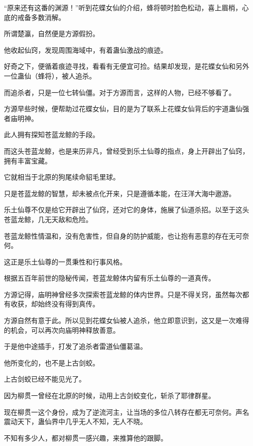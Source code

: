 
\begin{this_body}



“原来还有这番的渊源！”听到花蝶女仙的介绍，蜂将顿时脸色松动，喜上眉梢，心底的戒备多数消解。

所谓楚瀛，自然便是方源假扮。

他收起仙窍，发现周围海域中，有着蛊仙激战的痕迹。

好奇之下，便循着痕迹寻找，看看有无便宜可捡。结果却发现，是花蝶女仙和另外一位蛊仙（蜂将），被人追杀。

而追杀者，只是一位七转仙僵。对于方源而言，这样的人物，已经不够看了。

方源早些时候，便帮助过花蝶女仙，目的是为了联系上花蝶女仙背后的宇道蛊仙强者庙明神。

此人拥有探知苍蓝龙鲸的手段。

而这头苍蓝龙鲸，也是来历非凡，曾经受到乐土仙尊的指点，身上开辟出了仙窍，拥有丰富宝藏。

它就相当于北原的狗尾续命貂毛里球。

只是苍蓝龙鲸的智慧，却未被点化开来，只是遵循本能，在汪洋大海中遨游。

乐土仙尊不仅是给它开辟出了仙窍，还对它的身体，施展了仙道杀招。以至于这头苍蓝龙鲸，几无天敌和危险。

苍蓝龙鲸性情温和，没有危害性，但自身的防护威能，也让抱有恶意的存在无可奈何。

这正是乐土仙尊的一贯秉性和行事风格。

根据五百年前世的隐秘传闻，苍蓝龙鲸体内留有乐土仙尊的一道真传。

方源记得，庙明神曾经多次探索苍蓝龙鲸的体内世界。只是不得关窍，虽然每次都有收获，却始终没有得到真传。

方源自然有意于此。所以见到花蝶女仙被人追杀，他立即意识到，这又是一次难得的机会，可以再次向庙明神释放善意。

于是他中途插手，打发了追杀者雷道仙僵葛温。

他所变化的，也不是上古剑蛟。

上古剑蛟已经不能见光了。

因为柳贯一曾经在北原的时候，动用上古剑蛟变化，斩杀了耶律群星。

现在柳贯一这个身份，成为了逆流河主，让当场的多位八转存在都无可奈何。声名震动天下，蛊仙界中几乎无人不知，无人不晓。

不知有多少人，都对柳贯一感兴趣，来推算他的跟脚。


\end{this_body}
